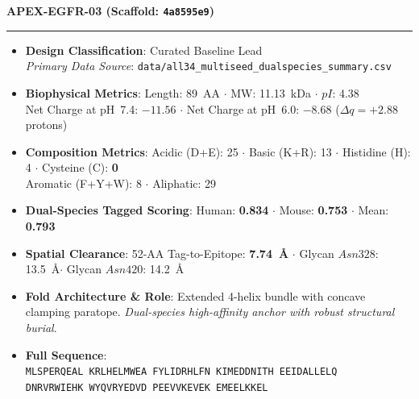 \documentclass[11pt]{article}
\begin{document}
\noindent\textbf{\color{navyblue}\large APEX-EGFR-03  \quad (Scaffold: \texttt{4a8595e9})} \\
\vspace{-0.4em}
\rule{\textwidth}{0.6pt}
\vspace{-0.2em}
\begin{itemize}
  \setlength{\itemsep}{2pt}
  \setlength{\parskip}{0pt}
  \item \textbf{Design Classification}: Curated Baseline Lead \\
    \textit{Primary Data Source}: \texttt{\small data/all34\_multiseed\_dualspecies\_summary.csv}
  \item \textbf{Biophysical Metrics}: Length: 89~AA $\cdot$ MW: 11.13~kDa $\cdot$ $pI$: 4.38 \\
    Net Charge at pH~7.4: $-11.56$ $\cdot$ Net Charge at pH~6.0: $-8.68$ ($\Delta q = +2.88$ protons)
  \item \textbf{Composition Metrics}: Acidic (D+E): 25 $\cdot$ Basic (K+R): 13 $\cdot$ Histidine (H): 4 $\cdot$ Cysteine (C): \textbf{0} \\
    Aromatic (F+Y+W): 8 $\cdot$ Aliphatic: 29
  \item \textbf{Dual-Species Tagged Scoring}: Human: \textbf{0.834} $\cdot$ Mouse: \textbf{0.753} $\cdot$ Mean: \textbf{0.793}
  \item \textbf{Spatial Clearance}: 52-AA Tag-to-Epitope: \textbf{7.74~\AA} $\cdot$ Glycan $Asn328$: 13.5~\AA $\cdot$ Glycan $Asn420$: 14.2~\AA
  \item \textbf{Fold Architecture \& Role}: Extended 4-helix bundle with concave clamping paratope. \textit{Dual-species high-affinity anchor with robust structural burial}.
  \item \textbf{Full Sequence}: \\
    \texttt{\small MLSPERQEAL KRLHELMWEA FYLIDRHLFN KIMEDDNITH EEIDALLELQ \\
    DNRVRWIEHK WYQVRYEDVD PEEVVKEVEK EMEELKKEL}
\end{itemize}
\vspace{0.8em}
\end{document}
